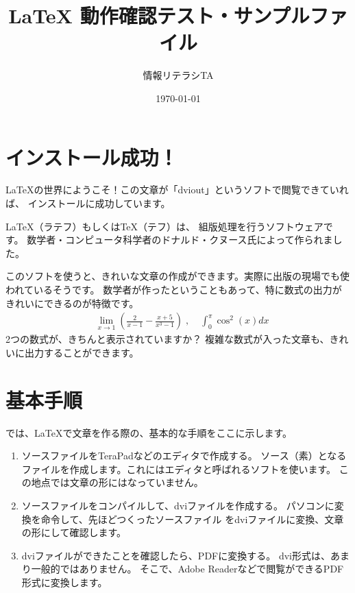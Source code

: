\documentclass[a4paper,11pt]{jsarticle}
\title{ {\LaTeX} 動作確認テスト・サンプルファイル}
\author{情報リテラシTA}
\date{\today}
\begin{document}
\maketitle


\section{インストール成功！}
\LaTeX の世界にようこそ！この文章が「dviout」というソフトで閲覧できていれば、
インストールに成功しています。

\LaTeX（ラテフ）もしくは\TeX（テフ）は、
組版処理を行うソフトウェアです。
数学者・コンピュータ科学者のドナルド・クヌース氏によって作られました。

このソフトを使うと、きれいな文章の作成ができます。実際に出版の現場でも使われているそうです。
数学者が作ったということもあって、特に数式の出力がきれいにできるのが特徴です。
\begin{eqnarray}
	& \displaystyle \lim _{x \rightarrow 1} \left( \frac{2}{x-1} - \frac{x+5}{x^3 -1} \right)\; ,\;
	& \displaystyle \int ^\pi _0 \cos ^2 (x)dx \nonumber
\end{eqnarray}
2つの数式が、きちんと表示されていますか？
複雑な数式が入った文章も、きれいに出力することができます。



\section{基本手順}

では、\LaTeX で文章を作る際の、基本的な手順をここに示します。

\begin{enumerate}
	\item ソースファイルをTeraPadなどのエディタで作成する。
	      ソース（素）となるファイルを作成します。これにはエディタと呼ばれるソフトを使います。
	      この地点では文章の形にはなっていません。
	\item ソースファイルをコンパイルして、dviファイルを作成する。
	      パソコンに変換を命令して、先ほどつくったソースファイル
	      をdviファイルに変換、文章の形にして確認します。
	\item dviファイルができたことを確認したら、PDFに変換する。
	      dvi形式は、あまり一般的ではありません。
	      そこで、Adobe Readerなどで閲覧ができるPDF形式に変換します。
\end{enumerate}
\end{document}
